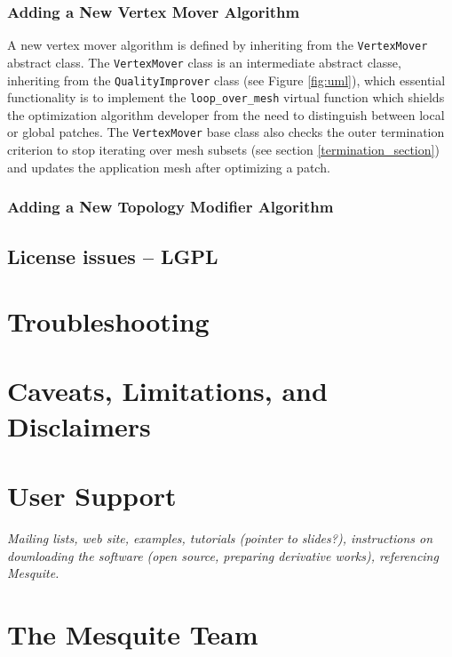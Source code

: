 \documentclass[letter]{report}
\begin{document}
\subsection{Adding a New Vertex Mover Algorithm}

A new vertex mover algorithm is defined by inheriting from the
\texttt{VertexMover} abstract class. The \texttt{VertexMover} class 
is an intermediate abstract classe, inheriting from the
\texttt{QualityImprover} class (see Figure \ref{fig:uml}),  which
essential functionality is to implement the \texttt{loop\_over\_mesh}
virtual function which shields the optimization algorithm developer
from the need to distinguish between local or global patches.  The
{\tt VertexMover} base class also checks the outer termination
criterion to stop iterating over mesh subsets (see section
\ref{termination_section}) and updates the application mesh after
optimizing a patch.


\subsection{Adding a New Topology Modifier Algorithm}

\section{License issues -- LGPL}


\chapter{Troubleshooting}

\chapter{Caveats, Limitations, and Disclaimers}

\chapter{User Support}

{\it Mailing lists, web site, examples, tutorials (pointer to slides?), 
instructions on downloading the software (open source, preparing 
derivative works), referencing Mesquite.}

\chapter{The Mesquite Team}
\end{document}
